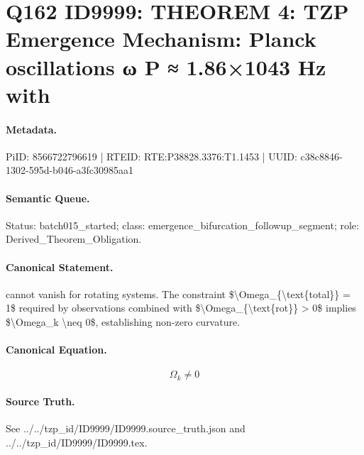 \section*{Q162 ID9999: THEOREM 4: TZP Emergence Mechanism: Planck oscillations ω P ≈ 1.86×1043 Hz with}
\paragraph{Metadata.}
PiID: 8566722796619 | RTEID: RTE:P38828.3376:T1.1453 | UUID: c38c8846-1302-595d-b046-a3fc30985aa1

\paragraph{Semantic Queue.}
Status: batch015\_started; class: emergence\_bifurcation\_followup\_segment; role: Derived\_Theorem\_Obligation.

\paragraph{Canonical Statement.}
cannot vanish for rotating systems. The constraint \$\textbackslash{}Omega\_\{\textbackslash{}text\{total\}\} = 1\$ required by observations combined with \$\textbackslash{}Omega\_\{\textbackslash{}text\{rot\}\} > 0\$ implies \$\textbackslash{}Omega\_k \textbackslash{}neq 0\$, establishing non-zero curvature.

\paragraph{Canonical Equation.}
\[
\Omega_k \neq 0
\]

\paragraph{Source Truth.}
See ../../tzp\_id/ID9999/ID9999.source\_truth.json and ../../tzp\_id/ID9999/ID9999.tex.
